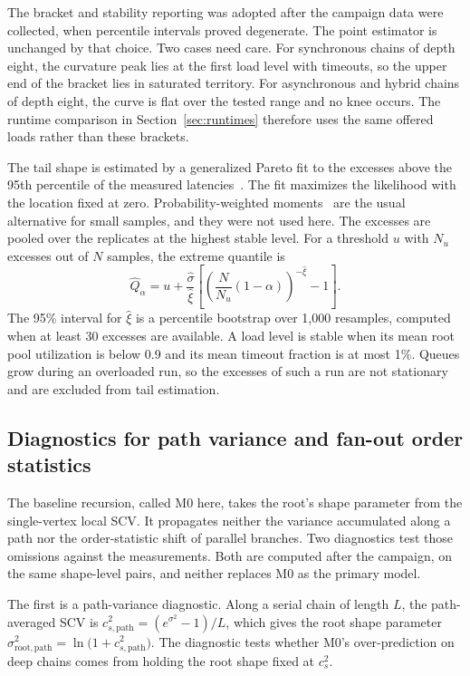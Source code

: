 The bracket and stability reporting was adopted after the campaign data were collected, when percentile intervals proved degenerate. The point estimator is unchanged by that choice. Two cases need care. For synchronous chains of depth eight, the curvature peak lies at the first load level with timeouts, so the upper end of the bracket lies in saturated territory. For asynchronous and hybrid chains of depth eight, the curve is flat over the tested range and no knee occurs. The runtime comparison in Section~\ref{sec:runtimes} therefore uses the same offered loads rather than these brackets.

The tail shape is estimated by a generalized Pareto fit to the excesses above the 95th percentile of the measured latencies~\cite{pickands1975extreme,davison1990exceedances}. The fit maximizes the likelihood with the location fixed at zero. Probability-weighted moments~\cite{hosking1987parameter} are the usual alternative for small samples, and they were not used here. The excesses are pooled over the replicates at the highest stable level. For a threshold $u$ with $N_u$ excesses out of $N$ samples, the extreme quantile is
\begin{equation}
  \hat{Q}_{\alpha} = u + \frac{\hat\sigma}{\hat\xi}\left[\left(\frac{N}{N_u}(1-\alpha)\right)^{-\hat\xi}-1\right].
  \label{eq:gpd}
\end{equation}
The 95\% interval for $\hat\xi$ is a percentile bootstrap over 1{,}000 resamples, computed when at least 30 excesses are available. A load level is stable when its mean root pool utilization is below 0.9 and its mean timeout fraction is at most 1\%. Queues grow during an overloaded run, so the excesses of such a run are not stationary and are excluded from tail estimation.

\subsection{Diagnostics for path variance and fan-out order statistics}
\label{sec:model_diag}

The baseline recursion, called M0 here, takes the root's shape parameter from the single-vertex local SCV. It propagates neither the variance accumulated along a path nor the order-statistic shift of parallel branches. Two diagnostics test those omissions against the measurements. Both are computed after the campaign, on the same shape-level pairs, and neither replaces M0 as the primary model.

The first is a path-variance diagnostic. Along a serial chain of length $L$, the path-averaged SCV is $c_{s,\mathrm{path}}^2=(e^{\sigma^2}-1)/L$, which gives the root shape parameter $\sigma_{\mathrm{root,path}}^2=\ln\bigl(1+c_{s,\mathrm{path}}^2\bigr)$. The diagnostic tests whether M0's over-prediction on deep chains comes from holding the root shape fixed at $c_s^2$.

